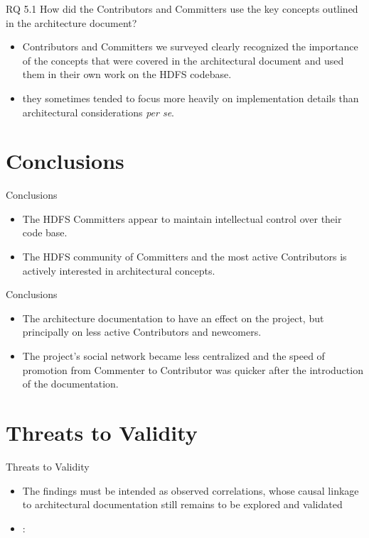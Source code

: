 \documentclass[t,14pt,mathserif]{beamer}
\begin{document}
\begin{frame}{RQ 5.1 How did the Contributors and Committers use the key concepts outlined in the architecture document?}
	\begin{itemize}
		\item Contributors and Committers we surveyed clearly recognized the importance of the concepts that were covered in the architectural document and used them in their own work on the HDFS codebase.
		\item they sometimes tended to focus more heavily on implementation details than architectural considerations \textit{per se}.		
	\end{itemize}
	
\end{frame}


\section{Conclusions}
\begin{frame}{Conclusions}
	\begin{itemize}
		\item The HDFS Committers appear to maintain intellectual control over their code base.
		\item The HDFS community of Committers and the most active Contributors is actively interested in architectural concepts.
	\end{itemize}
	
\end{frame}

\begin{frame}{Conclusions}
	\begin{itemize}
		\item The architecture documentation  to have an effect on the project, but principally on less active Contributors and newcomers.
		\item The project's social network became less centralized and the speed of promotion from Commenter to Contributor was quicker after the introduction of the documentation.
	\end{itemize}
	
\end{frame}

\section{Threats to Validity}
\begin{frame}{Threats to Validity}
	\begin{itemize}
	     \item The findings must be intended as observed correlations, whose causal linkage to architectural documentation still remains to be explored and validated
             \item :
	\end{itemize}

\end{frame}
\end{document}
